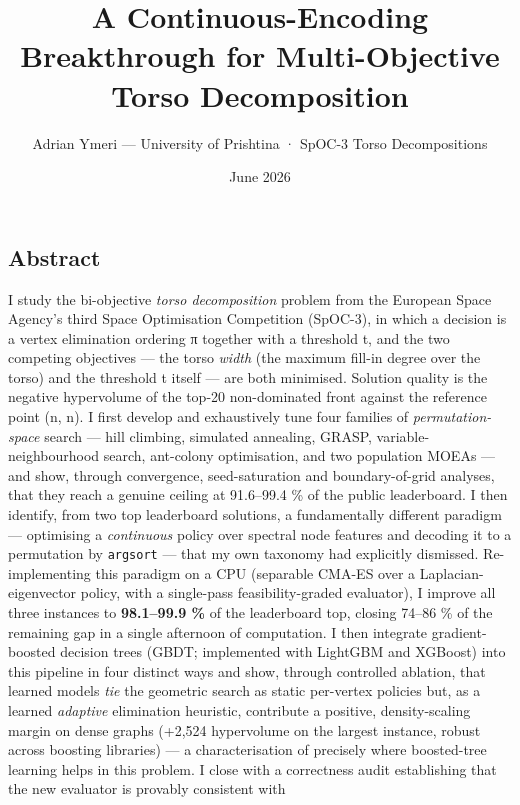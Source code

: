 \documentclass[
  11pt,
]{article}
\title{A Continuous-Encoding Breakthrough for Multi-Objective Torso
Decomposition}
\author{Adrian Ymeri --- University of Prishtina · SpOC-3 Torso
Decompositions}
\date{June 2026}
\begin{document}
\maketitle

{
\hypersetup{linkcolor=black}
\setcounter{tocdepth}{3}
\tableofcontents
}
\hypertarget{abstract}{%
\subsection{Abstract}\label{abstract}}

I study the bi-objective \emph{torso decomposition} problem from the
European Space Agency's third Space Optimisation Competition (SpOC-3),
in which a decision is a vertex elimination ordering π together with a
threshold t, and the two competing objectives --- the torso \emph{width}
(the maximum fill-in degree over the torso) and the threshold t itself
--- are both minimised. Solution quality is the negative hypervolume of
the top-20 non-dominated front against the reference point (n, n). I
first develop and exhaustively tune four families of
\emph{permutation-space} search --- hill climbing, simulated annealing,
GRASP, variable-neighbourhood search, ant-colony optimisation, and two
population MOEAs --- and show, through convergence, seed-saturation and
boundary-of-grid analyses, that they reach a genuine ceiling at
91.6--99.4 \% of the public leaderboard. I then identify, from two top
leaderboard solutions, a fundamentally different paradigm --- optimising
a \emph{continuous} policy over spectral node features and decoding it
to a permutation by \texttt{argsort} --- that my own taxonomy had
explicitly dismissed. Re-implementing this paradigm on a CPU (separable
CMA-ES over a Laplacian-eigenvector policy, with a single-pass
feasibility-graded evaluator), I improve all three instances to
\textbf{98.1--99.9 \%} of the leaderboard top, closing 74--86 \% of the
remaining gap in a single afternoon of computation. I then integrate
gradient-boosted decision trees (GBDT; implemented with LightGBM and
XGBoost) into this pipeline in four distinct ways and show, through
controlled ablation, that learned models \emph{tie} the geometric search
as static per-vertex policies but, as a learned \emph{adaptive}
elimination heuristic, contribute a positive, density-scaling margin on
dense graphs (+2,524 hypervolume on the largest instance, robust across
boosting libraries) --- a characterisation of precisely where
boosted-tree learning helps in this problem. I close with a correctness
audit establishing that the new evaluator is provably consistent with
\end{document}
